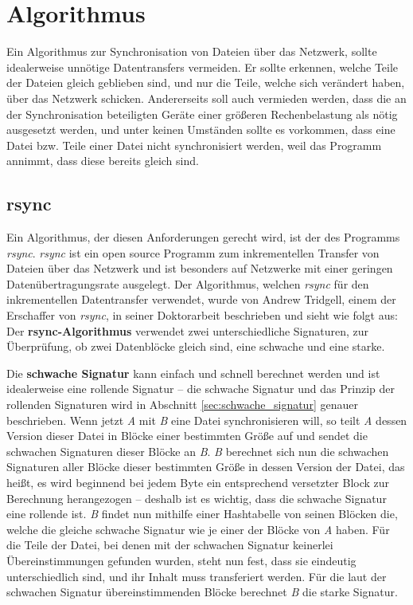 \section{Algorithmus}
\label{cha:Algorithmus}

Ein Algorithmus zur Synchronisation von Dateien über das Netzwerk, sollte idealerweise unnötige Datentransfers vermeiden.
Er sollte erkennen, welche Teile der Dateien gleich geblieben sind, und nur die Teile, welche sich verändert haben, über das Netzwerk schicken.
Andererseits soll auch vermieden werden, dass die an der Synchronisation beteiligten Geräte einer größeren Rechenbelastung als nötig ausgesetzt werden,
und unter keinen Umständen sollte es vorkommen, dass eine Datei bzw. Teile einer Datei nicht synchronisiert werden, weil das Programm annimmt,
dass diese bereits gleich sind.

\subsection{rsync}
\label{sec:rsync}

Ein Algorithmus, der diesen Anforderungen gerecht wird, ist der des Programms \textit{rsync}\cite{rsync}. \textit{rsync} ist ein open source Programm zum 
inkrementellen Transfer von Dateien über das Netzwerk und ist besonders auf Netzwerke mit einer geringen Datenübertragungsrate ausgelegt\cite{rsync}.
Der Algorithmus, welchen \textit{rsync} für den inkrementellen Datentransfer verwendet, wurde von Andrew Tridgell, einem der Erschaffer von 
\textit{rsync}\cite{wiki_rsync}, in seiner Doktorarbeit beschrieben\cite{Tridgell99} und sieht wie folgt aus:
\\

Der \textbf{rsync-Algorithmus} verwendet zwei unterschiedliche Signaturen, zur Überprüfung, ob zwei Datenblöcke gleich sind, eine schwache und 
eine starke\cite{Tridgell99}. 

Die \textbf{schwache Signatur} kann einfach und schnell berechnet werden und ist idealerweise eine rollende Signatur -- die schwache Signatur und das
Prinzip der rollenden Signaturen wird in Abschnitt \ref{sec:schwache_signatur} genauer beschrieben. Wenn jetzt \emph{A} mit \emph{B} eine Datei 
synchronisieren will, so teilt \emph{A} dessen Version dieser Datei in Blöcke einer bestimmten Größe auf und sendet die schwachen Signaturen dieser 
Blöcke an \emph{B}. \emph{B} berechnet sich nun die schwachen Signaturen aller Blöcke dieser bestimmten Größe in dessen Version der Datei, das heißt, 
es wird beginnend bei jedem Byte ein entsprechend versetzter Block zur Berechnung herangezogen -- deshalb ist es wichtig, dass die schwache Signatur eine 
rollende ist. \emph{B} findet nun mithilfe einer Hashtabelle von seinen Blöcken die, welche die gleiche schwache Signatur wie je einer der Blöcke von 
\emph{A} haben. Für die Teile der Datei, bei denen mit der schwachen Signatur keinerlei Übereinstimmungen gefunden wurden, steht nun fest, dass sie eindeutig 
unterschiedlich sind, und ihr Inhalt muss transferiert werden. Für die laut der schwachen Signatur übereinstimmenden Blöcke berechnet \emph{B} die 
starke Signatur.

